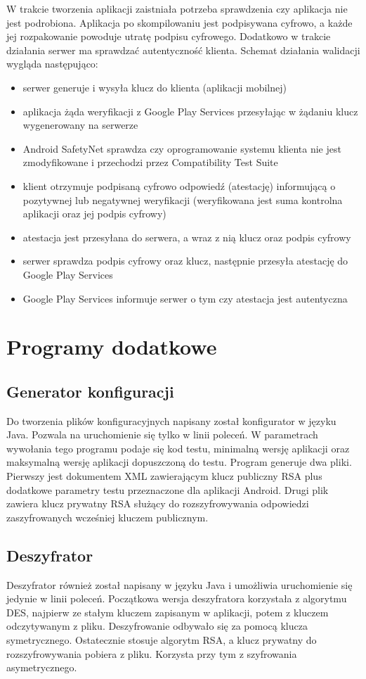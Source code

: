 \documentclass[eng]{mgr}
\begin{document}
			W trakcie tworzenia aplikacji zaistniała potrzeba sprawdzenia czy aplikacja nie jest podrobiona. Aplikacja po skompilowaniu jest podpisywana cyfrowo, a każde jej rozpakowanie powoduje utratę podpisu cyfrowego. Dodatkowo w trakcie działania serwer ma sprawdzać autentyczność klienta. Schemat działania walidacji wygląda następująco:
			\begin{itemize}
				\item serwer generuje i wysyła klucz do klienta (aplikacji mobilnej)
				\item aplikacja żąda weryfikacji z Google Play Services przesyłając w żądaniu klucz wygenerowany na serwerze
				\item Android SafetyNet sprawdza czy oprogramowanie systemu klienta nie jest zmodyfikowane i przechodzi przez Compatibility Test Suite
				\item klient otrzymuje podpisaną cyfrowo odpowiedź (atestację) informującą o pozytywnej lub negatywnej weryfikacji (weryfikowana jest suma kontrolna aplikacji oraz jej podpis cyfrowy)
				\item atestacja jest przesyłana do serwera, a wraz z nią klucz oraz podpis cyfrowy
				\item serwer sprawdza podpis cyfrowy oraz klucz, następnie przesyła atestację do Google Play Services
				\item Google Play Services informuje serwer o tym czy atestacja jest autentyczna
			\end{itemize}
			
		\section{Programy dodatkowe}
		
			\subsection{Generator konfiguracji}
			Do tworzenia plików konfiguracyjnych napisany został konfigurator w języku Java. Pozwala na uruchomienie się tylko w linii poleceń. W parametrach wywołania tego programu podaje się kod testu, minimalną wersję aplikacji oraz maksymalną wersję aplikacji dopuszczoną do testu. Program generuje dwa pliki. Pierwszy jest dokumentem XML zawierającym klucz publiczny RSA plus dodatkowe parametry testu przeznaczone dla aplikacji Android. Drugi plik zawiera klucz prywatny RSA służący do rozszyfrowywania odpowiedzi zaszyfrowanych wcześniej kluczem publicznym.
			
			\subsection{Deszyfrator}
			Deszyfrator również został napisany w języku Java i umożliwia uruchomienie się jedynie w linii poleceń. Początkowa wersja deszyfratora korzystała z algorytmu DES, najpierw ze stałym kluczem zapisanym w aplikacji, potem z kluczem odczytywanym z pliku. Deszyfrowanie odbywało się za pomocą klucza symetrycznego. Ostatecznie stosuje algorytm RSA, a klucz prywatny do rozszyfrowywania pobiera z pliku. Korzysta przy tym z szyfrowania asymetrycznego.
			
\end{document}
